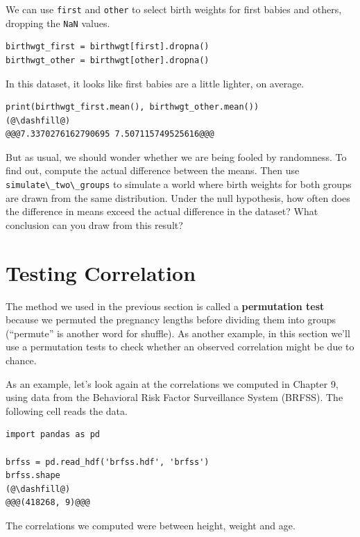 We can use \passthrough{\lstinline!first!} and
\passthrough{\lstinline!other!} to select birth weights for first babies
and others, dropping the \passthrough{\lstinline!NaN!} values.

\begin{lstlisting}[]
birthwgt_first = birthwgt[first].dropna()
birthwgt_other = birthwgt[other].dropna()
\end{lstlisting}

In this dataset, it looks like first babies are a little lighter, on
average.

\begin{lstlisting}[]
print(birthwgt_first.mean(), birthwgt_other.mean())
(@\dashfill@)
@@@7.3370276162790695 7.507115749525616@@@
\end{lstlisting}

But as usual, we should wonder whether we are being fooled by
randomness. To find out, compute the actual difference between the
means. Then use \passthrough{\lstinline!simulate\_two\_groups!} to
simulate a world where birth weights for both groups are drawn from the
same distribution. Under the null hypothesis, how often does the
difference in means exceed the actual difference in the dataset? What
conclusion can you draw from this result?

\hypertarget{testing-correlation}{%
\section{Testing Correlation}\label{testing-correlation}}

The method we used in the previous section is called a
\textbf{permutation test} because we permuted the pregnancy lengths
before dividing them into groups (``permute'' is another word for
shuffle). As another example, in this section we'll use a permutation
tests to check whether an observed correlation might be due to chance.

As an example, let's look again at the correlations we computed in
Chapter 9, using data from the Behavioral Risk Factor Surveillance
System (BRFSS). The following cell reads the data.

\begin{lstlisting}[]
import pandas as pd

brfss = pd.read_hdf('brfss.hdf', 'brfss')
brfss.shape
(@\dashfill@)
@@@(418268, 9)@@@
\end{lstlisting}

The correlations we computed were between height, weight and age.

